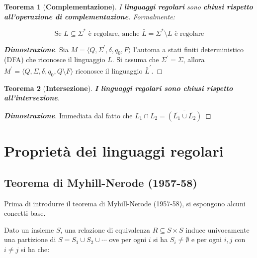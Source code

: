 \documentclass[a4paper]{article}
\newtheorem{theorem}{Teorema}
\begin{document}
	\vspace{2em}

	\begin{theorem}[\textcolor{Red3}{\textbf{Complementazione}}]
		I \textbf{linguaggi regolari} sono \textbf{chiusi rispetto all'operazione di complementazione}. Formalmente:
		
		\begin{equation*}
			\text{Se } L \subseteq \Sigma^{*} \text{ è regolare, anche } \bar{L} = \Sigma^{*} \setminus L \text{ è regolare}
		\end{equation*}
	\end{theorem}
	\begin{proof}[\textcolor{Green4}{\textbf{Dimostrazione}}]
		Sia $M = \langle Q, \Sigma^{'}, \delta, q_{0}, F \rangle$ l'automa a stati finiti deterministico (DFA) che riconosce il linguaggio $L$. Si assuma che $\Sigma^{'} = \Sigma$, allora $M^{'} = \langle Q, \Sigma, \delta, q_{0}, Q \setminus F \rangle$ riconosce il linguaggio $\bar{L}^{'}$.
	\end{proof}

	\vspace{2em}

	\begin{theorem}[\textcolor{Red3}{\textbf{Intersezione}}]
		\textbf{I linguaggi regolari sono chiusi rispetto all'intersezione}.
	\end{theorem}
	\begin{proof}[\textcolor{Green4}{\textbf{Dimostrazione}}]
		Immediata dal fatto che $L_{1} \cap L_{2} = \overline{\left(\overline{L_{1}} \cup \overline{L_{2}}\right)}$
	\end{proof}

	\newpage
	
	\section{Proprietà dei linguaggi regolari}
	
	\subsection{Teorema di Myhill-Nerode (1957-58)}
	
	Prima di introdurre il teorema di Myhill-Nerode (1957-58), si espongono alcuni concetti base.\newline
	
	\noindent
	Dato un insieme $S$, una relazione di equivalenza $R \subseteq S \times S$ induce univocamente una partizione di $S = S_{1} \cup S_{2} \cup \cdots$ ove per ogni $i$ si ha $S_{i} \ne \emptyset$ e per ogni $i, j$ con $i \ne j$ si ha che:
	
\end{document}
